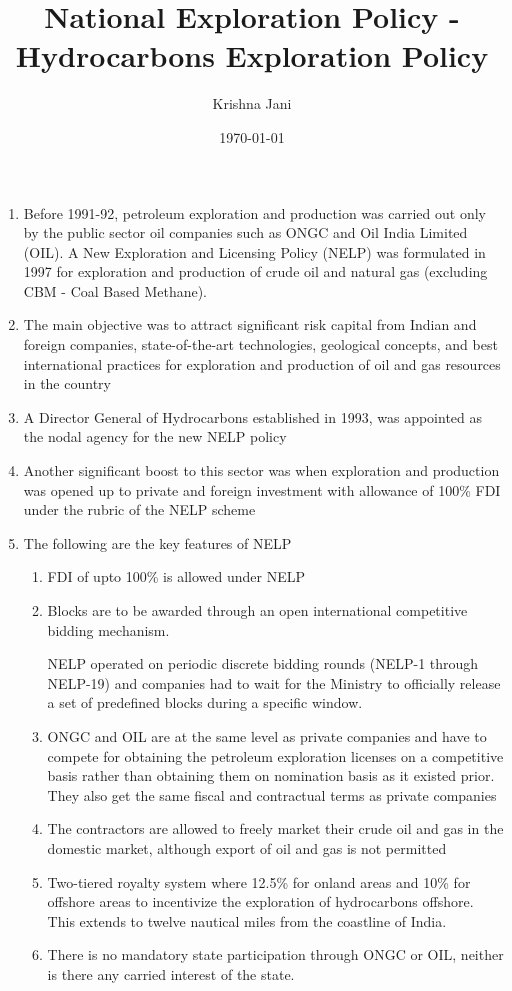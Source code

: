 \documentclass[12pt]{article}
\author{Krishna Jani}
\date{\today}
\title{National Exploration Policy - Hydrocarbons Exploration Policy}
\begin{document}
\maketitle

\begin{enumerate}
\item Before 1991-92, petroleum exploration and production was carried out only by the public sector oil companies such as ONGC and Oil India Limited (OIL). A New Exploration and Licensing Policy (NELP) was formulated in 1997 for exploration and production of crude oil and natural gas (excluding CBM - Coal Based Methane).
\item The main objective was to attract significant risk capital from Indian and foreign companies, state-of-the-art technologies, geological concepts, and best international practices for exploration and production of oil and gas resources in the country
\item A Director General of Hydrocarbons established in 1993, was appointed as the nodal agency for the new NELP policy
\item Another significant boost to this sector was when exploration and production was opened up to private and foreign investment with allowance of 100\% FDI under the rubric of the NELP scheme
\item The following are the key features of NELP
    \begin{enumerate}
        \item FDI of upto 100\% is allowed under NELP
        \item Blocks are to be awarded through an open international competitive bidding mechanism.

        NELP operated on periodic discrete bidding rounds (NELP-1 through NELP-19) and companies had to wait for the Ministry to officially release a set of predefined blocks during a specific window.
        \item ONGC and OIL are at the same level as private companies and have to compete for obtaining the petroleum exploration licenses on a competitive basis rather than obtaining them on nomination basis as it existed prior. They also get the same fiscal and contractual terms as private companies
        \item The contractors are allowed to freely market their crude oil and gas in the domestic market, although export of oil and gas is not permitted
        \item Two-tiered royalty system where 12.5\% for onland areas and 10\% for offshore areas to incentivize the exploration of hydrocarbons offshore. This extends to twelve nautical miles from the coastline of India.
        \item There is no mandatory state participation through ONGC or OIL, neither is there any carried interest of the state.


\end{enumerate}
\end{enumerate}
\end{document}
